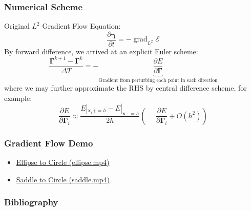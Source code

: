 \documentclass{beamer}
\theoremstyle{remark}
\newcommand{\gammabf}{\boldsymbol{\gamma}}
\newcommand{\Gammabf}{\boldsymbol{\Gamma}}
\newcommand{\xbf}{\mathbf{x}}
\DeclareMathOperator{\grad}{grad}
\begin{document}
\begin{frame}
    \frametitle{Numerical Scheme}
    Original $L^2$ Gradient Flow Equation:
    \begin{equation}
        \frac{\partial \gammabf}{\partial t} = - \grad_{L^2} \mathcal{E}
    \end{equation}
    By forward difference, we arrived at an explicit Euler scheme:
    \begin{equation*}
        \frac{\Gammabf^{k+1} - \Gammabf^k}{\Delta T} = - \underbrace{\frac{\partial E}{\partial \Gammabf}}_{\text{Gradient from perturbing each point in each direction}}
    \end{equation*}
    where we may further approximate the RHS by central difference scheme, for example:
    \begin{equation*}
        \frac{\partial E}{\partial \Gammabf_i} \approx \frac{E|_{\xbf_i += h} - E|_{\xbf -= h}}{2h} \left(= \frac{\partial E}{\partial \Gammabf_i} + O(h^2) \right)
    \end{equation*}
\end{frame}

\begin{frame}
    \frametitle{Gradient Flow Demo}
    \begin{itemize}
        \item \href{run:./demos/ellipse.mp4}{Ellipse to Circle (ellipse.mp4)}
        \item \href{run:./demos/saddle.mp4}{Saddle to Circle (saddle.mp4)}
    \end{itemize}
\end{frame}

\begin{frame}
    \frametitle{Bibliography}
    \printbibliography
\end{frame}
\end{document}
